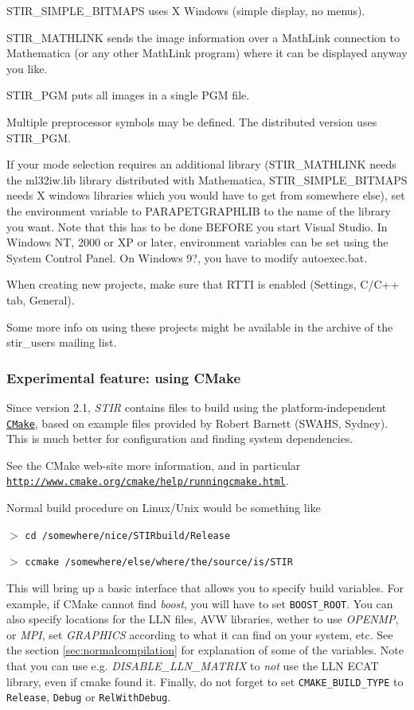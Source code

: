 \documentclass{article}
\def\R2Lurl#1#2{\mbox{\href{#1}{\tt #2}}}
\newcommand{\cmdline}[1]{\par \noindent $>$ \texttt{#1}\par}
\begin{document}
STIR\_SIMPLE\_BITMAPS uses X Windows (simple display, no menus).


STIR\_MATHLINK sends the image information over a MathLink connection 
to Mathematica (or any other MathLink program) where it can be 
displayed anyway you like.


STIR\_PGM puts all images in a single PGM file.


Multiple preprocessor symbols may be defined. The distributed 
version uses STIR\_PGM.


If your mode selection requires an additional library (STIR\_MATHLINK 
needs the ml32iw.lib library distributed with Mathematica, STIR\_SIMPLE\_BITMAPS 
needs X windows libraries which you would have to get from somewhere 
else), set the environment variable to PARAPETGRAPHLIB to the 
name of the library you want. Note that this has to be done BEFORE 
you start Visual Studio. In Windows NT, 2000 or XP or later, environment 
variables can be set using the System Control Panel. On Windows 
9?, you have to modify autoexec.bat. 



When creating new projects, make sure that RTTI is enabled (Settings, 
C/C++ tab, General). 



Some more info on using these projects might be available in 
the archive of the stir\_users mailing list.

\subsubsection{
Experimental feature: using CMake}
\label{sec:UsingCMake}
Since version 2.1, \textit{STIR} contains files to build using the platform-independent
\R2Lurl{"http://www.cmake.org"}{CMake}, based on example files provided by 
Robert Barnett (SWAHS, Sydney). This is much better for configuration and finding 
system dependencies.

See the CMake web-site more information, and in particular\\
\R2Lurl{http://www.cmake.org/cmake/help/runningcmake.html}{http://www.cmake.org/cmake/help/runningcmake.html}.

Normal build procedure on Linux/Unix would be something like

\cmdline{cd /somewhere/nice/STIRbuild/Release}
\cmdline{ccmake /somewhere/else/where/the/source/is/STIR}

This will bring up a basic interface that allows you to specify build variables. For example,
if CMake cannot find \textit{boost}, you will have to set \texttt{BOOST\_ROOT}. You can also
specify locations for the LLN files, AVW libraries, wether to use \textit{OPENMP}, or
\textit{MPI}, set \textit{GRAPHICS} according to what it can find on your system, etc. 
See the section \ref{sec:normalcompilation} for explanation of some
of the variables. Note that you can use e.g. \textit{DISABLE\_LLN\_MATRIX} to \textit{not}
use the LLN ECAT library, even if cmake found it. Finally, do not forget to set
\texttt{CMAKE\_BUILD\_TYPE} to \texttt{Release}, \texttt{Debug} or \texttt{RelWithDebug}.
\end{document}

